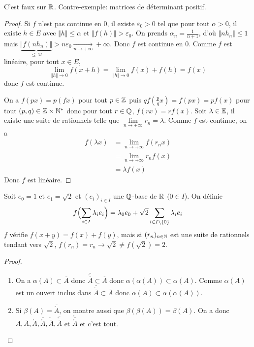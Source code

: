 \begin{remark}
	C'est faux sur $\mathbb{R}$. Contre-exemple: matrices de déterminant positif.
\end{remark}

\begin{proof}
	Si $f$ n'est pas continue en 0, il existe $\varepsilon_{0}>0$ tel que pour tout $\alpha>0$, il existe $h\in E$ avec $\Vert h\Vert\leqslant\alpha$ et $\Vert f(h)\Vert>\varepsilon_{0}$. On prends $\alpha_{n}=\frac{1}{n+1}$, d'où $\Vert nh_{n}\Vert\leqslant1$ mais $\underbrace{\Vert f(nh_{n})\Vert}_{\leqslant M}>n\varepsilon_{0}\xrightarrow[n\to+\infty]{}+\infty$. Donc $f$ est continue en $0$. Comme $f$ est linéaire, pour tout $x\in E$,
	\begin{equation}\lim\limits_{\Vert h\Vert\to0}f(x+h)=\lim\limits_{\Vert h\Vert\to0}f(x)+f(h)=f(x)\end{equation}
	donc $f$ est continue.

	On a $f(px)=p(fx)$ pour tout $p\in\mathbb{Z}$ puis $qf(\frac{p}{q}x)=f(px)=pf(x)$ pour tout $(p,q)\in\mathbb{Z}\times\mathbb{N}^{*}$ donc pour tout $r\in\mathbb{Q}$, $f(rx)=rf(x)$.
	Soit $\lambda\in\mathbb{E}$, il existe une suite de rationnels telle que $\lim\limits_{n\to+\infty} r_{n}=\lambda$. Comme $f$ est continue, on a 
	\begin{align}
		f(\lambda x)
		&=\lim\limits_{n\to+\infty}f(r_{n}x)\\
		&=\lim\limits_{n\to+\infty}r_{n}f(x)\\
		&=\lambda f(x)
	\end{align}
	Donc $f$ est linéaire.
\end{proof}

\begin{remark}
	Soit $e_{0}=1$ et $e_{1}=\sqrt{2}$ et $(e_{i})_{i\in I}$ une $\mathbb{Q}$-base de $\mathbb{R}$ ($0\in I$). On définie 
	\begin{equation}f\Bigl(\sum_{i\in I}\lambda_{i} e_{i}\Bigr)=\lambda_{0}e_{0}+\sqrt{2}\sum_{i\in I\setminus\{0\}}\lambda_{i}e_{i}\end{equation}
	$f$ vérifie $f(x+y)=f(x)+f(y)$, mais si $(r_{n})_{n\in\mathbb{N}}$ est une suite de rationnels tendant vers $\sqrt{2}$, $f(r_{n})=r_{n}\to\sqrt{2}\neq f(\sqrt{2})=2$.
\end{remark}

\begin{proof}
	\phantom{}
	\begin{enumerate}
		\item On a $\alpha(A)\subset \overline{A}$ donc $\overline{\mathring{\overline{A}}}\subset\overline{A}$ donc $\alpha(\alpha(A))\subset\alpha(A)$. Comme $\alpha(A)$ est un ouvert inclus dans $\overline{\mathring{\overline{A}}}\subset\overline{A}$ donc $\alpha(A)\subset\alpha(\alpha(A))$.

		\item Si $\beta(A)=\overline{\mathring{A}}$, on montre aussi que $\beta(\beta(A))=\beta(A)$. On a donc $A,\overline{A},\mathring{A},\overline{\mathring{A}},\mathring{\overline{A}},\overline{\mathring{\overline{A}}}$ et $\mathring{\overline{\mathring{A}}}$ et c'est tout.
	\end{enumerate}
\end{proof}

